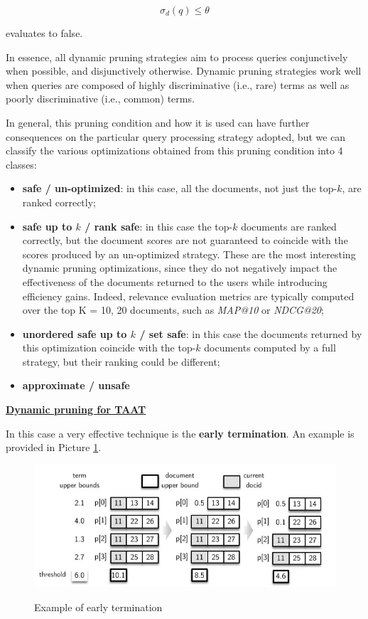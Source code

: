 $$
\sigma_d(q) \leq \theta 
$$

evaluates to false. 

In essence, all dynamic pruning strategies aim to process queries conjunctively when possible, and disjunctively otherwise. Dynamic pruning strategies work well when queries are composed of highly discriminative (i.e., rare) terms as well as poorly discriminative (i.e., common) terms.

In general, this pruning condition and how it is used can have further consequences on the particular query processing strategy adopted, but we can classify the various optimizations obtained from this pruning condition into 4 classes:

\begin{itemize}
    \item \textbf{safe / un-optimized}: in this case, all the documents, not just the top-$k$, are ranked correctly;
    \item \textbf{safe up to $k$ / rank safe}: in this case the top-$k$ documents are ranked correctly, but the document scores are not guaranteed to coincide with the scores produced by an un-optimized strategy. These are the most interesting dynamic pruning optimizations, since they do not negatively impact the effectiveness of the documents returned to the users while introducing efficiency gains. Indeed, relevance evaluation metrics are typically computed over the top K = 10, 20 documents, such as \textit{MAP@10} or \textit{NDCG@20};
    \item \textbf{unordered safe up to $k$ / set safe}: in this case the documents returned by this optimization coincide with the top-$k$ documents computed by a full strategy, but their ranking could be different;
    \item \textbf{approximate / unsafe}
\end{itemize}

\underline{\textbf{Dynamic pruning for TAAT}}

In this case a very effective technique is the \textbf{early termination}. An example is provided in Picture \ref{early termination}.

\begin{figure}[h!]
		\centering
		\includegraphics[scale = 1.8]{img/early termination.jpg}
        \label{early termination}
        \caption{Example of early termination}
\end{figure}

